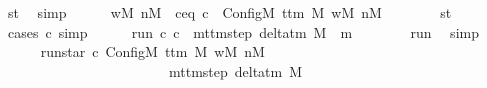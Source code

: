 \begin{isabellebody}
\ st{\isacharprime}{\kern0pt}{\isacharprime}{\kern0pt}\ \isamarkupfalse%
\ simp\isanewline
\ \ \ \ \isamarkupfalse%
\ wM{\isacharprime}{\kern0pt}\ nM{\isacharprime}{\kern0pt}\ \ c{\isacharprime}{\kern0pt}{\isacharprime}{\kern0pt}{\isacharunderscore}{\kern0pt}eq{\isacharcolon}{\kern0pt}\ {\isachardoublequoteopen}c{\isacharprime}{\kern0pt}{\isacharprime}{\kern0pt}\ {\isacharequal}{\kern0pt}\ Config\isactrlsub M\ {\isacharparenleft}{\kern0pt}t{\isacharunderscore}{\kern0pt}tm\ {\isacharquery}{\kern0pt}M{\isacharprime}{\kern0pt}{\isacharparenright}{\kern0pt}\ wM{\isacharprime}{\kern0pt}\ nM{\isacharprime}{\kern0pt}{\isachardoublequoteclose}\isanewline
\ \ \ \ \ \ \isamarkupfalse%
\ st{}\ \isamarkupfalse%
\ {\isacharparenleft}{\kern0pt}cases\ c{\isacharprime}{\kern0pt}{\isacharprime}{\kern0pt}{\isacharparenright}{\kern0pt}\ simp\isanewline
\ \ \ \ \isamarkupfalse%
\ run{\isacharprime}{\kern0pt}{\isacharcolon}{\kern0pt}\ {\isachardoublequoteopen}{\isacharparenleft}{\kern0pt}{\isacharquery}{\kern0pt}c{\isacharprime}{\kern0pt}{\isacharcomma}{\kern0pt}\ c{\isacharprime}{\kern0pt}{\isacharprime}{\kern0pt}{\isacharparenright}{\kern0pt}\ {\isasymin}\ {\isacharparenleft}{\kern0pt}mttm{\isacharunderscore}{\kern0pt}step\ {\isacharparenleft}{\kern0pt}delta{\isacharunderscore}{\kern0pt}tm\ {\isacharquery}{\kern0pt}M{\isacharprime}{\kern0pt}{\isacharparenright}{\kern0pt}{\isacharparenright}{\kern0pt}\ {\isacharcircum}{\kern0pt}{\isacharcircum}{\kern0pt}\ m{\isachardoublequoteclose}\isanewline
\ \ \ \ \ \ \isamarkupfalse%
\ run\ \isamarkupfalse%
\ simp\isanewline
\ \ \ \ \isamarkupfalse%
\ run{\isacharunderscore}{\kern0pt}star{\isacharprime}{\kern0pt}{\isacharcolon}{\kern0pt}\ {\isachardoublequoteopen}{\isacharparenleft}{\kern0pt}{\isacharquery}{\kern0pt}c{\isacharprime}{\kern0pt}{\isacharcomma}{\kern0pt}\ Config\isactrlsub M\ {\isacharparenleft}{\kern0pt}t{\isacharunderscore}{\kern0pt}tm\ {\isacharquery}{\kern0pt}M{\isacharprime}{\kern0pt}{\isacharparenright}{\kern0pt}\ wM{\isacharprime}{\kern0pt}\ nM{\isacharprime}{\kern0pt}{\isacharparenright}{\kern0pt}\isanewline
\ \ \ \ \ \ \ \ \ \ \ \ \ \ \ \ \ \ \ \ \ \ \ {\isasymin}\ {\isacharparenleft}{\kern0pt}mttm{\isacharunderscore}{\kern0pt}step\ {\isacharparenleft}{\kern0pt}delta{\isacharunderscore}{\kern0pt}tm\ {\isacharquery}{\kern0pt}M{\isacharprime}{\kern0pt}{\isacharparenright}{\kern0pt}{\isacharparenright}{\kern0pt}\isactrlsup {\isacharasterisk}{\kern0pt}{\isachardoublequoteclose}\isanewline

\end{isabellebody}
